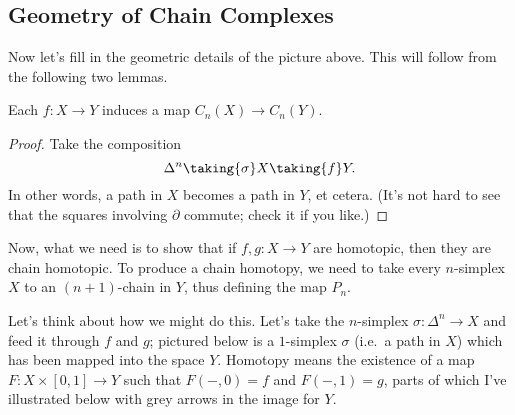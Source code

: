 \subsection*{Geometry of Chain Complexes}
Now let's fill in the geometric details of the picture above.
This will follow from the following two lemmas.
\begin{lemma}
	Each $f : X \to Y$ induces a map $C_n(X) \to C_n(Y)$.
\end{lemma}
\begin{proof}
	Take the composition
	\[ \Delta^n \taking{\sigma} X \taking{f} Y. \]
	In other words, a path in $X$ becomes a path in $Y$, et cetera.
	(It's not hard to see that the squares involving $\partial$ commute;
	check it if you like.)
\end{proof}

Now, what we need is to show that if $f , g : X \to Y$ are homotopic,
then they are chain homotopic.
To produce a chain homotopy, we need to take every $n$-simplex $X$
to an $(n+1)$-chain in $Y$, thus defining the map $P_n$.

Let's think about how we might do this. Let's take the $n$-simplex $\sigma : \Delta^n \to X$
and feed it through $f$ and $g$; pictured below is a $1$-simplex $\sigma$ (i.e.\ a path in $X$)
which has been mapped into the space $Y$.
Homotopy means the existence of a map $F : X \times [0,1] \to Y$
such that $F(-,0) = f$ and $F(-,1) = g$, parts of which I've illustrated below with grey arrows
in the image for $Y$.

